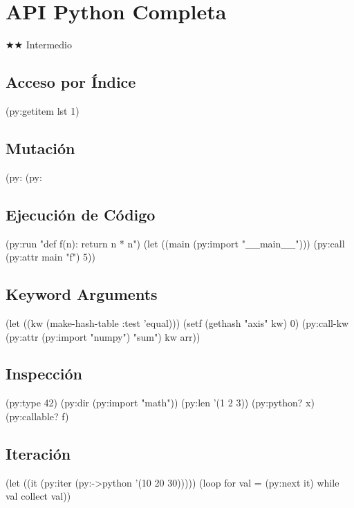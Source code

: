 \chapter{API Python Completa}
\label{chap:python-api}
{\huge$\bigstar$}{\huge$\bigstar$} Intermedio

\section{Acceso por Índice}
\begin{lispcode}
(py:getitem lst 1)
\end{lispcode}

\section{Mutación}
\begin{lispcode}
(py:%
(py:%
\end{lispcode}

\section{Ejecución de Código}
\begin{lispcode}
(py:run "def f(n): return n * n")
(let ((main (py:import "__main__"))) (py:call (py:attr main "f") 5))
\end{lispcode}

\section{Keyword Arguments}
\begin{lispcode}
(let ((kw (make-hash-table :test 'equal)))
  (setf (gethash "axis" kw) 0)
  (py:call-kw (py:attr (py:import "numpy") "sum") kw arr))
\end{lispcode}

\section{Inspección}
\begin{lispcode}
(py:type 42) (py:dir (py:import "math")) (py:len '(1 2 3))
(py:python? x) (py:callable? f)
\end{lispcode}

\section{Iteración}
\begin{lispcode}
(let ((it (py:iter (py:->python '(10 20 30)))))
  (loop for val = (py:next it) while val collect val))
\end{lispcode}

